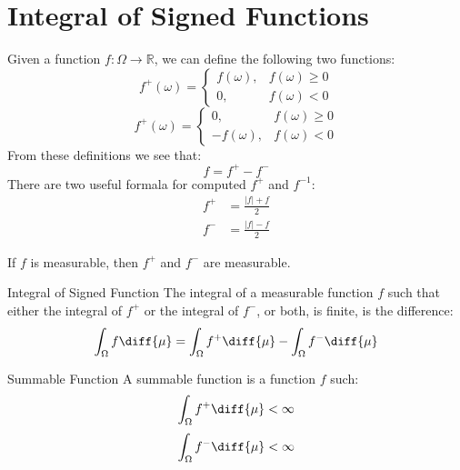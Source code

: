 \section{Integral of Signed Functions}
    Given a function $f:\Omega\rightarrow\mathbb{R}$, we can define
    the following two functions:
    \begin{equation}
        f^{+}(\omega)=
        \begin{cases}
            f(\omega),&f(\omega)\geq{0}\\
            0,&f(\omega)<0
        \end{cases}
    \end{equation}
    \begin{equation}
        f^{+}(\omega)=
        \begin{cases}
            0,&f(\omega)\geq{0}\\
            -f(\omega),&f(\omega)<0
        \end{cases}
    \end{equation}
    From these definitions we see that:
    \begin{equation}
        f=f^{+}-f^{-}
    \end{equation}
    There are two useful formala for computed $f^{+}$ and $f^{-1}$:
    \begin{align}
        f^{+}&=\frac{|f|+f}{2}\\
        f^{-}&=\frac{|f|-f}{2}
    \end{align}
    \begin{theorem}
        If $f$ is measurable, then $f^{+}$ and $f^{-}$ are measurable.
    \end{theorem}
    \begin{ldefinition}{Integral of Signed Function}
        The integral of a measurable function $f$ such that either
        the integral of $f^{+}$ or the integral of $f^{-}$, or both,
        is finite, is the difference:
        \begin{equation}
            \int_{\Omega}f\diff{\mu}=
            \int_{\Omega}f^{+}\diff{\mu}-\int_{\Omega}f^{-}\diff{\mu}
        \end{equation}
    \end{ldefinition}
    \begin{ldefinition}{Summable Function}
        A summable function is a function $f$ such:
        \begin{equation}
            \int_{\Omega}f^{+}\diff{\mu}<\infty
        \end{equation}
        \begin{equation}
            \int_{\Omega}f^{-}\diff{\mu}<\infty
        \end{equation}
    \end{ldefinition}
